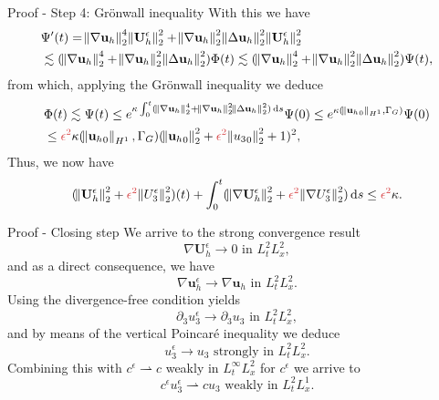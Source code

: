\documentclass{beamer}
\newcommand*\diff{\mathop{}\!\mathrm{d}}
\begin{document}
\begin{frame}{Proof - Step 4: Gr\"onwall inequality}
With this we have
%
\begin{equation}
  \begin{split} \nonumber
   & \Psi'(t) = \norm{\nabla \mathbf{u}_h}_2^4 \norm{\mathbf{U}_h^\epsilon}_2^2 + \norm{\nabla \mathbf{u}_h}_2^2  \norm{\Delta \mathbf{u}_h}_2^2 \norm{\mathbf{U}_h^\epsilon}_2^2 \\
   & \lesssim (\norm{\nabla \mathbf{u}_h}_2^4 + \norm{\nabla \mathbf{u}_h}_2^2  \norm{\Delta \mathbf{u}_h}_2^2) \Phi (t) \lesssim (\norm{\nabla \mathbf{u}_h}_2^4 + \norm{\nabla \mathbf{u}_h}_2^2  \norm{\Delta \mathbf{u}_h}_2^2)\Psi(t),
  \end{split}
\end{equation}
%
from which, applying the Gr\"onwall inequality we deduce
%
\begin{equation}
  \begin{split} \nonumber
    & \Phi (t) \lesssim \Psi (t) \leq e^{\kappa \int_0 ^ t (\norm{\nabla \mathbf{u}_h}_2^4 + \norm{\nabla \mathbf{u}_h}_2^2  \norm{\Delta \mathbf{u}_h}_2^2) \diff s} \Psi (0) \leq e^{\kappa(\norm{{\mathbf{u}_h}_0}_{H^1}, \Gamma_G)} \Psi(0) \\
    & \leq \textcolor{jasper}{\epsilon^2} \kappa (\norm{{\mathbf{u}_h}_0}_{H^1}, \Gamma_G) (\norm{{\mathbf{u}_h}_0}_2^2 + \textcolor{jasper}{\epsilon^2} \norm{{u_3}_0}_2^2 + 1)^2,
  \end{split}
\end{equation}
%
Thus, we now have
$$ (\norm{\mathbf{U}_h^\epsilon}_2^2 + \textcolor{jasper}{\epsilon^2} \norm{U_3^\epsilon}_2^2)(t) + \int_0^t (\norm{\nabla \mathbf{U}_h^\epsilon}_2^2 + \textcolor{jasper}{\epsilon^2} \norm{\nabla U_3^\epsilon}_2^2) \diff s \leq \textcolor{jasper}{\epsilon^2} \kappa.$$
\end{frame}

\begin{frame}{Proof - Closing step}
We arrive to the strong convergence result
$$\nabla \mathbf{U}_h^\epsilon \to 0 \text{ in } L^2_t L^2_x,$$
and as a direct consequence, we have
$$\nabla \mathbf{u}_h^\epsilon \to \nabla \mathbf{u}_h \text{ in } L^2_t L^2_x.$$
Using the divergence-free condition yields
$$\partial_3 u_3^\epsilon \to \partial_3 u_3 \text{ in } L^2_t L^2_x,$$
and by means of the vertical Poincar\'e inequality we deduce
%
\begin{equation}\nonumber
u_3^\epsilon \to u_3 \text{ strongly in } L^2_t L^2_x.
\end{equation}
%
Combining this with $c^\epsilon \rightharpoonup c$ weakly in $L_t^\infty L_x^2$ for $c^\epsilon$ we arrive to
%
\begin{equation}\nonumber c^\epsilon u_3^\epsilon \rightharpoonup c u_3 \text{ weakly in } L_t^2 L_x^1.\end{equation}
\end{frame}
\end{document}
